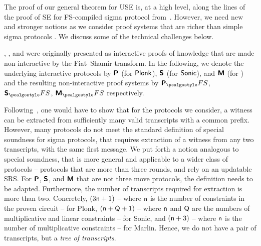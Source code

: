 The proof of our general theorem for USE is, at a high level, along the lines of the proof of SE for FS-compiled sigma protocol
from~\cite{INDOCRYPT:FKMV12}. However, we need new and stronger notions as we consider proof systems that are
richer than simple sigma protocols . We discuss some of the technical challenges below.

\plonk{}, \sonic{}, and \marlin{} were originally presented
as interactive proofs of knowledge that are made non-interactive by the Fiat--Shamir transform. In the following,
we denote the underlying interactive protocols by $\bm{\mathsf{P}}$ (for $\textnormal{\textsf{Plonk}}$), $\bm{\mathsf{S}}$ (for ${\textnormal{\textsf{Sonic}}}$), and $\bm{\mathsf{M}}$ (for \marlin) and the resulting non-interactive proof systems by
$\plonkprotfs$, $\sonicprotfs$, $\marlinprotfs$ respectively.

  Following~\cite{INDOCRYPT:FKMV12}, one
would have to show that for the protocols we consider, a witness can be extracted from
sufficiently many valid transcripts with a common prefix. However, many protocols do not meet
the standard definition of special soundness for sigma protocols, that requires extraction of a
witness from any two transcripts, with the same first message. We put forth a notion analogous
to special soundness, that is more general and applicable to a wider class of protocols --
protocols that are more than three rounds, and rely on an updatable SRS. For $\bm{\mathsf{P}}$,
$\bm{\mathsf{S}}$, and $\bm{\mathsf{M}}$ that are not three move protocols, the definition needs to be
adapted. Furthermore, the number of transcripts required for extraction is more than
two. Concretely, $(3 \mathsf{n} + 1)$ -- where $\mathsf{n}$ is the number of constraints in the proven
circuit -- for Plonk, $(\mathsf{n} + \mathsf{Q} + 1)$ -- where $\mathsf{n}$ and $\mathsf{Q}$
are the numbers of multiplicative and linear constraints -- for Sonic, and $(\mathsf{n} + 3)$
-- where $\mathsf{n}$ is the number of multiplicative constraints -- for Marlin. Hence, we do
not have a pair of transcripts, but a \emph{tree of transcripts}.

